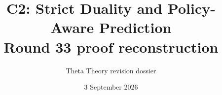 \documentclass[11pt]{article}
\title{C2: Strict Duality and Policy-Aware Prediction\\\large Round 33 proof reconstruction}
\author{Theta Theory revision dossier}
\date{3 September 2026}
\begin{document}
\maketitle
\reviewnote

\end{document}
